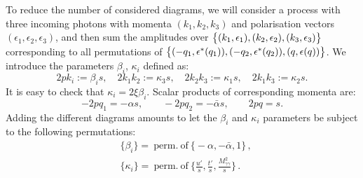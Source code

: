 \documentclass[aps,prd,superscriptaddress,floatfix,showpacs]{revtex4}
\begin{document}
To reduce the number of considered diagrams, we will consider a process with three incoming photons with momenta $(k_1,k_2,k_3)$ and polarisation vectors $(\epsilon_1, \epsilon_2, \epsilon_3)$, 
and then sum the amplitudes over $\big{\{}(k_1,\epsilon_1), (k_2, \epsilon_2) ,(k_3,\epsilon_3)\big{\}}$ corresponding to all permutations of $\big{\{}(-q_1,\epsilon^* (q_1)), (-q_2, \epsilon^* (q_2) ) ,(q,\epsilon(q) )\big{\}}$.
We introduce the parameters $\beta_i$, $\kappa_i$ defined as: %
\begin{equation}
2pk_i := \beta_i s, \quad 2k_1 k_2 := \kappa_3 s, \quad 2k_2 k_3 := \kappa_1  s, \quad 2k_1 k_3 := \kappa_2  s.
\end{equation}
It is easy to check that $\kappa_i = 2\xi \beta_i.$
Scalar products of corresponding momenta are:
\begin{equation}
-2pq_1 = -\alpha s, \qquad -2pq_2 = -\bar{\alpha} s, \qquad 2pq = s.
\end{equation}
Adding the different diagrams amounts to let the  $\beta_i$ and $\kappa_i$ parameters  
be subject to the following permutations: 
\begin{equation}
\begin{aligned}
&\{\beta_i\} = \: \mathrm{perm.} \: \mathrm{of} \: \Big\{ -\alpha, - \bar{\alpha}, 1 \Big\}\,,
\\
&\{\kappa_i\} = \: \mathrm{perm.} \: \mathrm{of} \: \Big\{ \frac{u'}{s} ,\frac{t'}{s} , \frac{M_{\gamma\gamma}^2}{s}\Big\}\,.
\end{aligned}
\end{equation}
\end{document}
